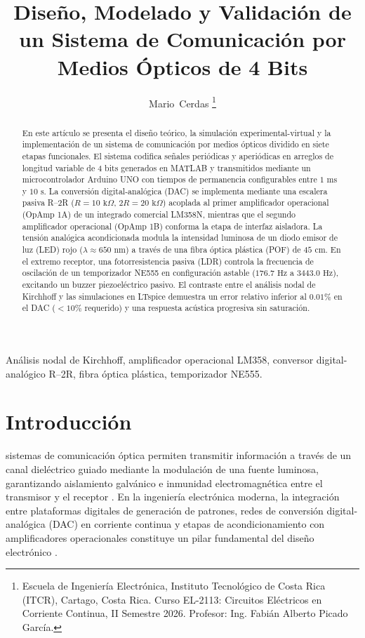 \documentclass[journal,transmag]{IEEEtran}
\title{Diseño, Modelado y Validación de un Sistema de Comunicación por Medios Ópticos de 4 Bits}
\author{Mario~Cerdas%
\thanks{Escuela de Ingeniería Electrónica, Instituto Tecnológico de Costa Rica (ITCR), Cartago, Costa Rica. Curso EL-2113: Circuitos Eléctricos en Corriente Continua, II Semestre 2026. Profesor: Ing. Fabián Alberto Picado García.}}
\begin{document}
\maketitle

\begin{abstract}
En este artículo se presenta el diseño teórico, la simulación experimental-virtual y la implementación de un sistema de comunicación por medios ópticos dividido en siete etapas funcionales. El sistema codifica señales periódicas y aperiódicas en arreglos de longitud variable de 4 bits generados en MATLAB y transmitidos mediante un microcontrolador Arduino UNO con tiempos de permanencia configurables entre $1\text{ ms}$ y $10\text{ s}$. La conversión digital-analógica (DAC) se implementa mediante una escalera pasiva R--2R ($R = 10\text{ k}\Omega$, $2R = 20\text{ k}\Omega$) acoplada al primer amplificador operacional (OpAmp 1A) de un integrado comercial LM358N, mientras que el segundo amplificador operacional (OpAmp 1B) conforma la etapa de interfaz aisladora. La tensión analógica acondicionada modula la intensidad luminosa de un diodo emisor de luz (LED) rojo ($\lambda \approx 650\text{ nm}$) a través de una fibra óptica plástica (POF) de $45\text{ cm}$. En el extremo receptor, una fotorresistencia pasiva (LDR) controla la frecuencia de oscilación de un temporizador NE555 en configuración astable ($176.7\text{ Hz}$ a $3443.0\text{ Hz}$), excitando un buzzer piezoeléctrico pasivo. El contraste entre el análisis nodal de Kirchhoff y las simulaciones en LTspice demuestra un error relativo inferior al $0.01\%$ en el DAC ($< 10\%$ requerido) y una respuesta acústica progresiva sin saturación.
\end{abstract}

\begin{IEEEkeywords}
Análisis nodal de Kirchhoff, amplificador operacional LM358, conversor digital-analógico R--2R, fibra óptica plástica, temporizador NE555.
\end{IEEEkeywords}

\section{Introducción}
 sistemas de comunicación óptica permiten transmitir información a través de un canal dieléctrico guiado mediante la modulación de una fuente luminosa, garantizando aislamiento galvánico e inmunidad electromagnética entre el transmisor y el receptor \cite{alexander2018}. En la ingeniería electrónica moderna, la integración entre plataformas digitales de generación de patrones, redes de conversión digital-analógica (DAC) en corriente continua y etapas de acondicionamiento con amplificadores operacionales constituye un pilar fundamental del diseño electrónico \cite{svoboda2014}.
\end{document}
